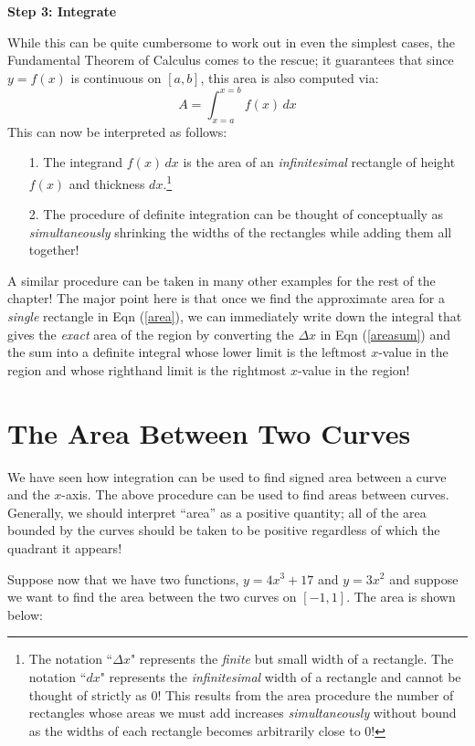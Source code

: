 \documentclass{ximera}
\begin{document}
\vspace{3mm}
\textbf{Step 3: Integrate}

While this can be quite cumbersome to work out in even the simplest cases, the Fundamental Theorem of Calculus comes to the rescue; it guarantees that since $y=f(x)$ is continuous on $[a,b]$, this area is also computed via: $$A = \int_{x=a}^{x=b} f(x) \, dx$$
This can now be interpreted as follows:
\begin{itemize}
\item[1.] The integrand $f(x) \, dx$ is the area of an \emph{infinitesimal} rectangle of height $f(x)$ and thickness $dx$.\footnote{The notation ``$\Delta x$" represents the \emph{finite} but small width of a rectangle.  The notation ``$dx$" represents the \emph{infinitesimal} width of a rectangle and cannot be thought of strictly as 0!  This results from the area procedure the number of rectangles whose areas we must add increases \emph{simultaneously} without bound as the widths of each rectangle becomes arbitrarily close to 0!}
\item[2.] The procedure of definite integration can be thought of conceptually as \emph{simultaneously} shrinking the widths of the rectangles while adding them all together!
\end{itemize}
A similar procedure can be taken in many other examples for the rest of the chapter! The major point here is that once we find the approximate area for a \emph{single} rectangle in Eqn (\ref{area}), we can immediately write down the integral that gives the \emph{exact} area of the region by converting the $\Delta x$ in Eqn (\ref{areasum}) and the sum into a definite integral whose lower limit is the leftmost $x$-value in the region and whose righthand limit is the rightmost $x$-value in the region!




\section{The Area Between Two Curves}

We have seen how integration can be used to find signed area between a curve and the $x$-axis. The above procedure can be used to find areas between curves.  Generally, we should interpret ``area'' as a positive quantity; all of the area bounded by the curves should be taken to be positive regardless of which the quadrant it appears!

Suppose now that we have two functions, $y=4x^3+17$ and $y=3x^2$ and suppose we want to find the area between the two curves on $[-1,1]$.  The area is shown below:
\end{document}
